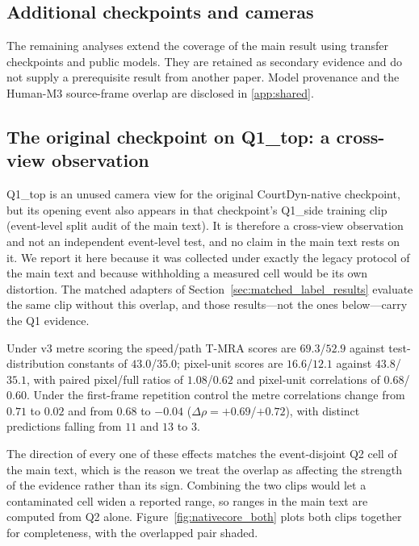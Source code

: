 
\subsection{Additional checkpoints and cameras}
\label{app:additional}

The remaining analyses extend the coverage of the main result using transfer
checkpoints and public models. They are retained as secondary evidence and
do not supply a prerequisite result from another paper. Model provenance and
the Human-M3 source-frame overlap are disclosed in \ref{app:shared}.

\subsection{The original checkpoint on Q1\_top: a cross-view observation}
\label{app:q1_crossview}

Q1\_top is an unused camera view for the original CourtDyn-native checkpoint,
but its opening event also appears in that checkpoint's Q1\_side training clip
(event-level split audit of the main text). It is therefore a cross-view observation and not
an independent event-level test, and no claim in the main text rests on it. We
report it here because it was collected under exactly the legacy protocol of
the main text and because withholding a measured cell would be its
own distortion. The matched adapters of
Section~\ref{sec:matched_label_results} evaluate the same clip without this
overlap, and those results---not the ones below---carry the Q1 evidence.

Under v3 metre scoring the speed/path T-MRA scores are $69.3$/$52.9$ against
test-distribution constants of $43.0$/$35.0$; pixel-unit scores are
$16.6$/$12.1$ against $43.8$/$35.1$, with paired pixel/full ratios of
$1.08$/$0.62$ and pixel-unit correlations of $0.68$/$0.60$. Under the
first-frame repetition control the metre correlations change from
$0.71$ to $0.02$ and from $0.68$ to $-0.04$ ($\Delta\rho=+0.69$/$+0.72$),
with distinct predictions falling from $11$ and $13$ to $3$.

The direction of every one of these effects matches the event-disjoint Q2 cell
of the main text, which is the reason we treat the overlap as
affecting the strength of the evidence rather than its sign. Combining the two
clips would let a contaminated cell widen a reported range, so ranges in the
main text are computed from Q2 alone. Figure~\ref{fig:nativecore_both} plots
both clips together for completeness, with the overlapped pair shaded.

